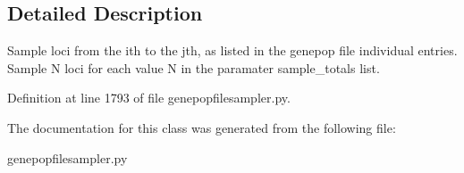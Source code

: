 \subsection{Detailed Description}
\begin{DoxyVerb}Sample loci from the ith to the jth, as listed in the 
genepop file individual entries. Sample N loci for each value
N in the paramater sample_totals list.
\end{DoxyVerb}
 

Definition at line 1793 of file genepopfilesampler.\+py.



The documentation for this class was generated from the following file\+:\begin{DoxyCompactItemize}
\item 
genepopfilesampler.\+py\end{DoxyCompactItemize}
